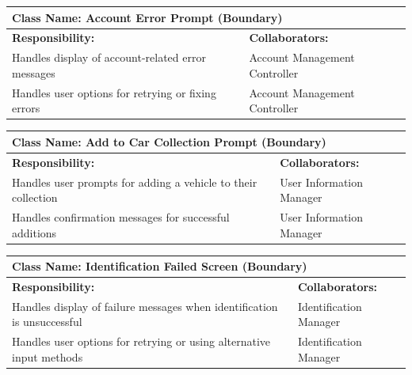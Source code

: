 \documentclass[]{article}
\begin{document}
\begin{table}[ht]
    \centering
    \begin{tabular}{|p{5cm}|p{5cm}|}
        \hline
        \multicolumn{2}{|l|}{\textbf{Class Name: Account Error Prompt (Boundary)}} \\
        \hline
        \textbf{Responsibility:} & \textbf{Collaborators:} \\
        \hline
        Handles display of account-related error messages & Account Management Controller \\
        Handles user options for retrying or fixing errors & Account Management Controller \\
        \hline
    \end{tabular}
\end{table}
 
\begin{table}[ht]
    \centering
    \begin{tabular}{|p{5cm}|p{5cm}|}
        \hline
        \multicolumn{2}{|l|}{\textbf{Class Name: Add to Car Collection Prompt (Boundary)}} \\
        \hline
        \textbf{Responsibility:} & \textbf{Collaborators:} \\
        \hline
        Handles user prompts for adding a vehicle to their collection & User Information Manager \\
        Handles confirmation messages for successful additions & User Information Manager \\
        \hline
    \end{tabular}
\end{table}
 
\begin{table}[ht]
    \centering
    \begin{tabular}{|p{5cm}|p{5cm}|}
        \hline
        \multicolumn{2}{|l|}{\textbf{Class Name: Identification Failed Screen (Boundary)}} \\
        \hline
        \textbf{Responsibility:} & \textbf{Collaborators:} \\
        \hline
        Handles display of failure messages when identification is unsuccessful & Identification Manager \\
        Handles user options for retrying or using alternative input methods & Identification Manager \\
        \hline
    \end{tabular}
\end{table}	
\end{document}
